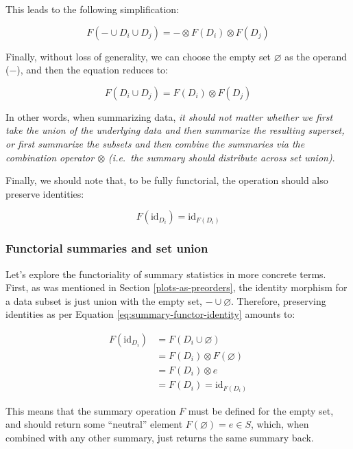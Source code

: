 \documentclass[
  openany]{book}
\theoremstyle{definition}
\theoremstyle{definition}
\theoremstyle{definition}
\theoremstyle{definition}
\theoremstyle{remark}
\begin{document}
This leads to the following simplification:

\[F(- \cup D_i \cup D_j) = - \otimes F(D_i) \otimes F(D_j)\]

Finally, without loss of generality, we can choose the empty set \(\varnothing\) as the operand (\(-\)), and then the equation reduces to:

\begin{equation}
F(D_i \cup D_j) = F(D_i) \otimes F(D_j)
\label{eq:summary-functor-composition}
\end{equation}

In other words, when summarizing data, \emph{it should not matter whether we first take the union of the underlying data and then summarize the resulting superset, or first summarize the subsets and then combine the summaries via the combination operator \(\otimes\) (i.e.~the summary should distribute across set union)}.

Finally, we should note that, to be fully functorial, the operation should also preserve identities:

\begin{equation}
F(\text{id}_{D_i}) = \text{id}_{F(D_i)}
\label{eq:summary-functor-identity}
\end{equation}

\subsubsection{Functorial summaries and set union}\label{functorial-summaries-and-set-union}

Let's explore the functoriality of summary statistics in more concrete terms. First, as was mentioned in Section \ref{plots-as-preorders}, the identity morphism for a data subset is just union with the empty set, \(- \cup \varnothing\). Therefore, preserving identities as per Equation \eqref{eq:summary-functor-identity} amounts to:

\begin{align}
F(\text{id}_{D_i}) &= F(D_i \cup \varnothing) \\
                   &= F(D_i) \otimes F(\varnothing) \\ 
                   &= F(D_i) \otimes e \\
                   &= F(D_i) = \text{id}_{F(D_i)}
\end{align}

This means that the summary operation \(F\) must be defined for the empty set, and should return some ``neutral'' element \(F(\varnothing) = e \in S\), which, when combined with any other summary, just returns the same summary back.
\end{document}
